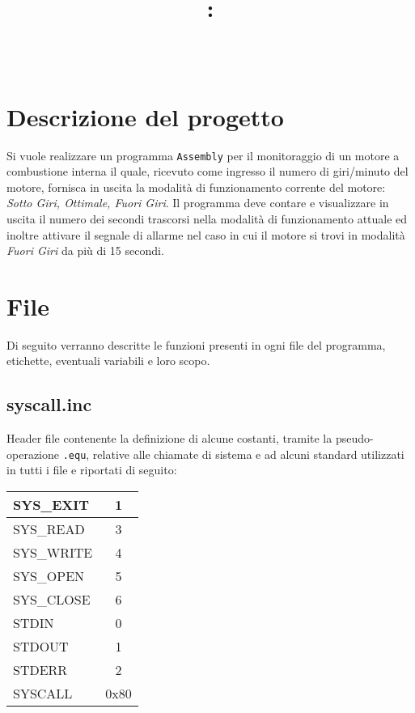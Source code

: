 \documentclass[a4paper,11pt]{article}
\title{
\vspace{2in}
\textmd{\textbf{\hmwkClass:\\ \hmwkTitle}}\\
\vspace{0.1in}\large{\textit{\hmwkAuthorName}}
\vspace{3in}
}
\newcommand{\Assembly}{\texttt{Assembly} }
\begin{document}
	\maketitle
	\newpage
	\tableofcontents
	\newpage
	
	\section{Descrizione del progetto}
	Si vuole realizzare un programma \Assembly per il monitoraggio di un motore a combustione interna il quale, ricevuto come ingresso il numero di giri/minuto del motore, fornisca in uscita la modalità di funzionamento corrente del motore: \textit{Sotto Giri, Ottimale, Fuori Giri}. Il programma deve contare e visualizzare in uscita il numero dei secondi trascorsi nella modalità di funzionamento attuale ed inoltre attivare il segnale di allarme nel caso in cui il motore si trovi in modalità \textit{Fuori Giri} da più di 15 secondi.
	
	
	\section{File}
	Di seguito verranno descritte le funzioni presenti in ogni file del programma, etichette, eventuali variabili e loro scopo. 
	
	\subsection{syscall.inc}
	Header file contenente la definizione di alcune costanti, tramite la pseudo-operazione \texttt{.equ}, relative alle chiamate di sistema e ad alcuni standard utilizzati in tutti i file e riportati di seguito:
	\begin{table}[h]
		\begin{tabular}{| l | c |}
			\hline
			SYS\_EXIT & 1 \\ \hline
			SYS\_READ & 3 \\ \hline
			SYS\_WRITE & 4 \\ \hline
			SYS\_OPEN & 5 \\ \hline
			SYS\_CLOSE & 6 \\ \hline
			STDIN & 0 \\ \hline
			STDOUT & 1 \\ \hline
			STDERR & 2			 \\ \hline
			SYSCALL & 0x80 \\ \hline
		\end{tabular}
	\end{table}
	
\end{document}
